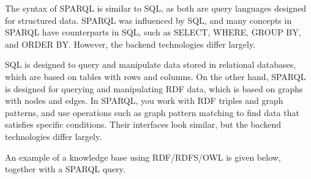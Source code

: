 The syntax of SPARQL is similar to SQL, as both are query languages designed for structured data. SPARQL was influenced by SQL, and many concepts in SPARQL have counterparts in SQL, such as SELECT, WHERE, GROUP BY, and ORDER BY. However, the backend technologies differ largely.

SQL is designed to query and manipulate data stored in relational databases, which are based on tables with rows and columns. On the other hand, SPARQL is designed for querying and manipulating RDF data, which is based on graphs with nodes and edges. In SPARQL, you work with RDF triples and graph patterns, and use operations such as graph pattern matching to find data that satisfies specific conditions. Their interfaces look similar, but the backend technologies differ largely.

An example of a knowledge base using RDF/RDFS/OWL is given below, together with a SPARQL query.

